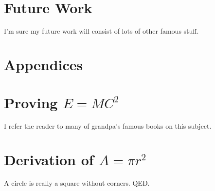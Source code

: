 \documentclass[botnum, fleqn]{unmeethesis}
\begin{document}
  \chapter{Future Work}
  I'm sure my future work will consist of lots of other famous stuff.

  \chapter*{Appendices}


  \appendix
  \chapter{Proving $E=MC^2$}
  I refer the reader to many of grandpa's famous books on this subject.
  \chapter{Derivation of $A = \pi r^2$}
  A circle is really a square without corners.  QED.

\end{document}
